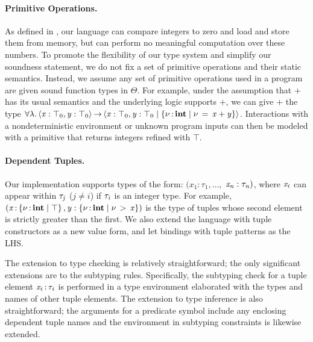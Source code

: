 \paragraph{Primitive Operations.}
As defined in , our language can compare integers to zero and load
and store them from memory, but can perform no meaningful computation
over these numbers. To promote the flexibility of our type system and simplify
our soundness statement, we do not
fix a set of primitive operations and their static semantics.
Instead, we assume any set of primitive operations
used in a program are given sound function types in $\Theta$.
For example, under the assumption that $+$ has its usual semantics
and the underlying logic supports $+$, we can give $+$ the type
$ \forall  \lambda .\left\langle{ \mathit{x}  :  \top_{{\mathrm{0}}}  ,  \mathit{y}  :  \top_{{\mathrm{0}}} }\right\rangle\operatorname{\rightarrow}\left\langle{ \mathit{x}  :  \top_{{\mathrm{0}}}  ,  \mathit{y}  :  \top_{{\mathrm{0}}} \mid  \left\{{  \nu  \operatorname{:}\mathbf{int}\mid  \nu \, = \, \mathit{x}  +  \mathit{y} }\right\}  }\right\rangle $.
Interactions with a nondeterministic environment
or unknown program inputs can then be modeled with a primitive
that returns integers refined with $ \top $.


\paragraph{Dependent Tuples.}
Our implementation supports types of the form: $( \mathit{x_{{\mathrm{1}}}} : \tau_{{\mathrm{1}}}, \ldots,$ $\mathit{x_{\mathit{n}}}:\tau_{\mathit{n}})$,
where $\mathit{x_{\mathit{i}}}$ can appear within $\tau_{\mathit{j}}$
($j\neq i$) if $\tau_{\mathit{i}}$ is an integer type. For example,
$(   \mathit{x} \operatorname{:}  \left\{{  \nu  \operatorname{:} \mathbf{int} \mid   \top  }\right\}    ,  \mathit{y}  :   \left\{{  \nu  \operatorname{:} \mathbf{int} \mid  \nu \, > \, \mathit{x} }\right\}   )$ is the type of tuples whose
second element is strictly greater than the first. We also extend
the language with tuple constructors as a new value form, and
let bindings with tuple patterns as the LHS.

The extension to type checking is relatively straightforward; the only
significant extensions are to the subtyping rules.
Specifically, the subtyping check for a tuple element
$ \mathit{x_{\mathit{i}}} \operatorname{:} \tau_{\mathit{i}} $ is performed in a type environment elaborated with the
types and names of other tuple elements.
The extension to type inference is also
straightforward; the arguments for a
predicate symbol include any enclosing dependent tuple names
and the environment in subtyping constraints is likewise extended.

